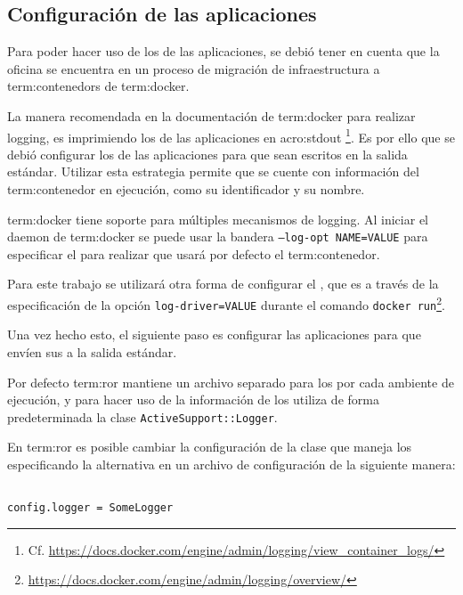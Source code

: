 \subsection{Configuración de las aplicaciones}
\label{configuracion_de_las_aplicaciones}

Para poder hacer uso de los  de las aplicaciones, se debió tener en
cuenta que la oficina se encuentra en un proceso de migración de
infraestructura a \glspl{term:contenedor} de \gls{term:docker}.

La manera recomendada en la documentación de \gls{term:docker} para realizar
logging, es imprimiendo los  de las aplicaciones en \gls{acro:stdout}
\footnote{Cf. \url{https://docs.docker.com/engine/admin/logging/view_container_logs/}}.
Es por ello que se debió configurar los  de las aplicaciones para que
sean escritos en la salida estándar. Utilizar esta estrategia permite que se
cuente con información del \gls{term:contenedor} en ejecución, como su
identificador y su nombre.

\gls{term:docker} tiene soporte para múltiples mecanismos de logging. Al
iniciar el daemon de \gls{term:docker} se puede usar la bandera
\texttt{--log-opt NAME=VALUE} para especificar el  para realizar
 que usará por defecto el \gls{term:contenedor}.

Para este trabajo se utilizará otra forma de configurar el , que es
a través de la especificación de la opción \texttt{log-driver=VALUE} durante el
comando \lstinline{docker run}\footnote{
\url{https://docs.docker.com/engine/admin/logging/overview/}}.

Una vez hecho esto, el siguiente paso es configurar las aplicaciones para que
envíen sus  a la salida estándar.

Por defecto \gls{term:ror} mantiene un archivo separado para los  por
cada ambiente de ejecución, y para hacer uso de la información de los 
utiliza de forma predeterminada la clase \texttt{ActiveSupport::Logger}.

En \gls{term:ror} es posible cambiar la configuración de la clase que maneja los
 especificando la alternativa en un archivo de configuración de la
siguiente manera:

\begin{lstlisting}

config.logger = SomeLogger

\end{lstlisting}


